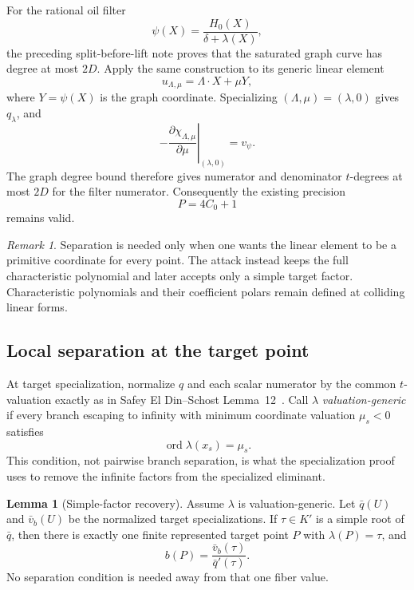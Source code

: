 \documentclass[11pt,a4paper]{article}
\theoremstyle{definition}
\newtheorem{lemma}[theorem]{Lemma}
\theoremstyle{remark}
\newtheorem{remark}[theorem]{Remark}
\newcommand{\ord}{\operatorname{ord}}
\begin{document}
For the rational oil filter
\[
 \psi(X)=\frac{H_0(X)}{\delta+\lambda(X)},
\]
the preceding split-before-lift note proves that the saturated graph curve has degree at most $2D$.  Apply the same construction to its generic linear element
\[
 u_{\Lambda,\mu}=\Lambda\cdot X+\mu Y,
\]
where $Y=\psi(X)$ is the graph coordinate.  Specializing $(\Lambda,\mu)=(\lambda,0)$ gives $q_\lambda$, and
\[
 -\left.\frac{\partial\chi_{\Lambda,\mu}}{\partial\mu}
 \right|_{(\lambda,0)}
 =v_\psi.
\]
The graph degree bound therefore gives numerator and denominator $t$-degrees at most $2D$ for the filter numerator.  Consequently the existing precision
\[
 P=4C_0+1
\]
remains valid.

\begin{remark}
Separation is needed only when one wants the linear element to be a primitive coordinate for every point.  The attack instead keeps the full characteristic polynomial and later accepts only a simple target factor.  Characteristic polynomials and their coefficient polars remain defined at colliding linear forms.
\end{remark}

\subsection{Local separation at the target point}\label{supp:sec:local}

At target specialization, normalize $q$ and each scalar numerator by the common $t$-valuation exactly as in Safey El Din--Schost Lemma~12~\cite{SafeySchost2018}.  Call $\lambda$ \emph{valuation-generic} if every branch escaping to infinity with minimum coordinate valuation $\mu_s<0$ satisfies
\[
 \ord \lambda(x_s)=\mu_s.
\]
This condition, not pairwise branch separation, is what the specialization proof uses to remove the infinite factors from the specialized eliminant.

\begin{lemma}[Simple-factor recovery]\label{supp:lem:simple}
Assume $\lambda$ is valuation-generic.  Let $\bar q(U)$ and $\bar v_b(U)$ be the normalized target specializations.  If $\tau\in K'$ is a simple root of $\bar q$, then there is exactly one finite represented target point $P$ with $\lambda(P)=\tau$, and
\[
 b(P)=\frac{\bar v_b(\tau)}{\bar q'(\tau)}.
\]
No separation condition is needed away from that one fiber value.
\end{lemma}
\end{document}
